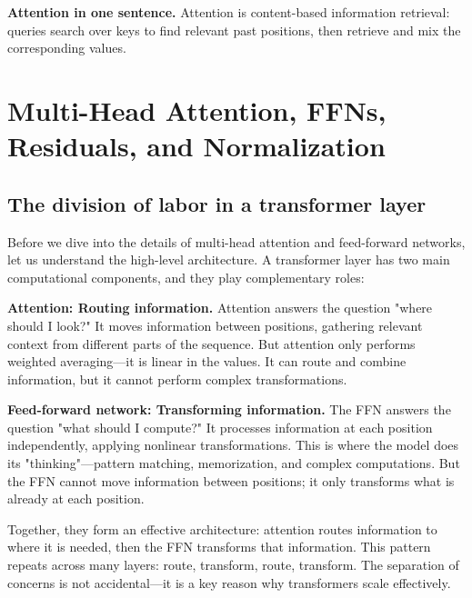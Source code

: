 \begin{intuitionbox}
\textbf{Attention in one sentence.} Attention is content-based information retrieval: queries search over keys to find relevant past positions, then retrieve and mix the corresponding values.
\end{intuitionbox}

\vspace{1.2em}

\section{Multi-Head Attention, FFNs, Residuals, and Normalization}
\label{sec:architecture_core}

\subsection{The division of labor in a transformer layer}
\label{sec:division_of_labor}

Before we dive into the details of multi-head attention and feed-forward networks, let us understand the high-level architecture. A transformer layer has two main computational components, and they play complementary roles:

\textbf{Attention: Routing information.} Attention answers the question "where should I look?" It moves information between positions, gathering relevant context from different parts of the sequence. But attention only performs weighted averaging---it is linear in the values. It can route and combine information, but it cannot perform complex transformations.

\textbf{Feed-forward network: Transforming information.} The FFN answers the question "what should I compute?" It processes information at each position independently, applying nonlinear transformations. This is where the model does its "thinking"---pattern matching, memorization, and complex computations. But the FFN cannot move information between positions; it only transforms what is already at each position.

Together, they form an effective architecture: attention routes information to where it is needed, then the FFN transforms that information. This pattern repeats across many layers: route, transform, route, transform. The separation of concerns is not accidental---it is a key reason why transformers scale effectively.

